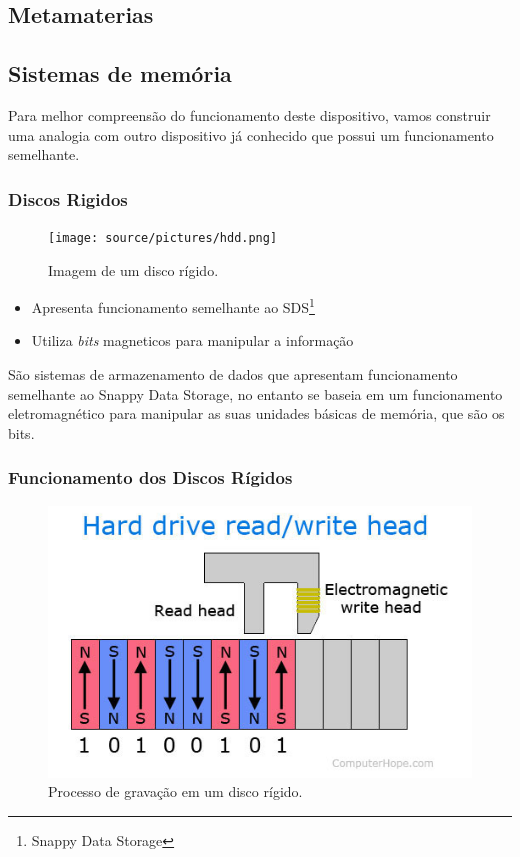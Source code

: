 \subsection{Metamaterias}

\subsection{Sistemas de memória}
    Para melhor compreensão do funcionamento deste dispositivo, vamos construir uma analogia com outro dispositivo já conhecido que possui um funcionamento semelhante.

\subsubsection{Discos Rigidos}

    \begin{figure}[H]
        \centering
        \texttt{[image: source/pictures/hdd.png]}
        \caption{Imagem de um disco rígido\cite{hdd-image}.}
        \label{fig:hdd}
    \end{figure}

    \begin{itemize}
        \item Apresenta funcionamento semelhante ao SDS\footnote{Snappy Data Storage}
        \item Utiliza \textit{bits} magneticos para manipular a informação
    
    \end{itemize}

    São sistemas de armazenamento de dados que apresentam funcionamento semelhante ao Snappy Data Storage, no entanto se baseia em um funcionamento eletromagnético para manipular as suas unidades básicas de memória, que são os bits.

\subsubsection{Funcionamento dos Discos Rígidos}

\begin{figure}[H]
    \centering
    \includegraphics[scale = 0.5]{source/pictures/magnetic-media.jpg}
    \caption{Processo de gravação em um disco rígido\cite{hdd-image}.}
    \label{fig:hdd-recording}
\end{figure}

